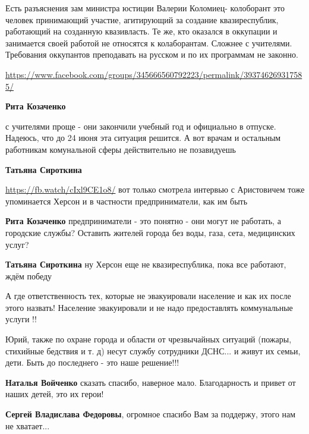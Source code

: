 \begin{itemize}

Есть разъяснения зам министра юстиции Валерии Коломиец- колоборант это человек
принимающий участие, агитирующий за создание квазиреспублик, работающий на
созданную квазивласть. Те же, кто оказался в оккупации и занимается своей
работой не относятся к колаборантам. Сложнее с учителями. Требования оккупантов
преподавать на русском и по их программам не
законно.

\url{https://www.facebook.com/groups/345666560792223/permalink/393746269317585/}

\begin{itemize} %
\textbf{Рита Козаченко} 

с учителями проще - они закончили учебный год и официально в отпуске. Надеюсь,
что до 24 июня эта ситуация решится. А вот врачам и остальным работникам
комунальной сферы действительно не позавидуешь

\textbf{Татьяна Сироткина} 

\url{https://fb.watch/cIxl9CE1o8/} вот только смотрела интервью с Аристовичем тоже
упоминается Херсон и в частности предприниматели, как им быть

\textbf{Рита Козаченко} предприниматели - это понятно - они могут не работать, а городские службы? Оставить жителей города без воды, газа, сета, медицинских услуг?

\textbf{Татьяна Сироткина} ну Херсон еще не квазиреспублика, пока все работают, ждём победу
\end{itemize} %


А где ответственность тех, которые не эвакуировали население и как их после
этого назвать! Население эвакуировали и не надо предоставлять коммунальные
услуги !!


Юрий, также по охране города и области от чрезвычайных ситуаций (пожары, стихийные
бедствия и т. д) несут службу сотрудники ДСНС... и живут их семьи, дети. Быть до
последнего - это наше решение!!!

\begin{itemize} %
\textbf{Наталья Войченко} сказать спасибо, наверное мало. Благодарность и привет от наших детей, это их герои!

\textbf{Сергей Владислава Федоровы}, огромное спасибо Вам за поддержу, этого нам не хватает...


\end{itemize}
\end{itemize}
